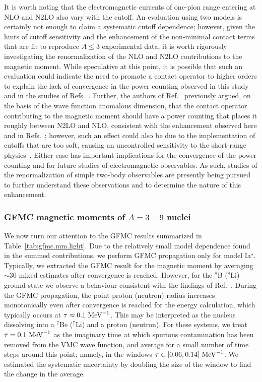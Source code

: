 \documentclass[aps,prc,floatfix,showpacs,twocolumn, preprintnumbers]{revtex4-2}
\begin{document}
It is worth noting that the electromagnetic currents of one-pion range entering at NLO and N2LO also vary with the cutoff. An evaluation using two models is certainly not enough to claim a systematic cutoff dependence; however, given the hints of cutoff sensitivity and the enhancement of the non-minimal contact terms that are fit to reproduce $A \leq 3$ experimental data, it is worth rigorously investigating the renormalization of the NLO and N2LO contributions to the magnetic moment. While speculative at this point, it is possible that such an evaluation could indicate the need to promote a contact operator to higher orders to explain the lack of convergence in the power counting observed in this study and in the studies of Refs.~\cite{Gnech:2022vwr,Martin:2023dhl}. Further, the authors of Ref.~\cite{Valderrama:2015} previously argued, on the basis of the wave function anomalous dimension, that the contact operator contributing to the magnetic moment should have a power counting that places it roughly between N2LO and NLO, consistent with the  enhancement observed here and in Refs.~\cite{Gnech:2022vwr,Martin:2023dhl}; however, such an effect could also be due to the implementation of cutoffs that are too soft, causing an uncontrolled sensitivity to the short-range physics~\cite{Hammer:2019poc}. Either case has important implications for the convergence of the power counting and for future studies of electromagnetic observables. As such, studies of the renormalization of simple two-body observables are presently being pursued to further understand these observations and to determine the nature of this enhancement.

\subsubsection{GFMC magnetic moments of $A=3-9$ nuclei} We now turn our attention to the GFMC results summarized in Table~\ref{tab:gfmc.mm.light}. Due to the relatively small model dependence  found in the summed contributions, we perform GFMC propagation only for model Ia$^{\star}$. Typically, we extracted the GFMC result for the magnetic moment by averaging  ${\sim}30$ mixed estimates after convergence is reached. However, for the $^8$B ($^8$Li) ground state we observe a behaviour consistent with the findings of Ref.~\cite{King:2020wmp}. During the GFMC propagation, the point proton (neutron) radius increases monotonically even after convergence is reached for the energy calculation, which typically occurs at $\tau\approx 0.1 {\rm ~MeV}^{-1}$. This may be interpreted as the nucleus dissolving into a $^7$Be ($^7$Li) and a proton (neutron). For these systems,  we  treat $\tau = 0.1 {\rm ~MeV}^{-1}$ as the imaginary time at which spurious contamination has been removed from the VMC wave function, and average for a small number of time steps around this point; namely, in the windows $\tau \in [0.06,0.14]~{\rm MeV}^{-1}$. We estimated the systematic uncertainty by doubling the size of the window to find the change in the average.
\end{document}
